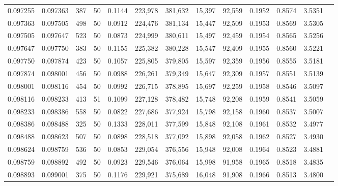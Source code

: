 \begin{tabular}{rrrrrrrrrrrrr}
0.097255 & 0.097363 &   387 &  50 &                                     0.1144 & 223,978 & 381,632 &  15,397 &  92,559 & 0.1952 & 0.8574 & 3.5351 \\
0.097363 & 0.097505 &   498 &  50 &                                     0.0912 & 224,476 & 381,134 &  15,447 &  92,509 & 0.1953 & 0.8569 & 3.5305 \\
0.097505 & 0.097647 &   523 &  50 &                                     0.0873 & 224,999 & 380,611 &  15,497 &  92,459 & 0.1954 & 0.8565 & 3.5256 \\
0.097647 & 0.097750 &   383 &  50 &                                     0.1155 & 225,382 & 380,228 &  15,547 &  92,409 & 0.1955 & 0.8560 & 3.5221 \\
0.097750 & 0.097874 &   423 &  50 &                                     0.1057 & 225,805 & 379,805 &  15,597 &  92,359 & 0.1956 & 0.8555 & 3.5181 \\
0.097874 & 0.098001 &   456 &  50 &                                     0.0988 & 226,261 & 379,349 &  15,647 &  92,309 & 0.1957 & 0.8551 & 3.5139 \\
0.098001 & 0.098116 &   454 &  50 &                                     0.0992 & 226,715 & 378,895 &  15,697 &  92,259 & 0.1958 & 0.8546 & 3.5097 \\
0.098116 & 0.098233 &   413 &  51 &                                     0.1099 & 227,128 & 378,482 &  15,748 &  92,208 & 0.1959 & 0.8541 & 3.5059 \\
0.098233 & 0.098386 &   558 &  50 &                                     0.0822 & 227,686 & 377,924 &  15,798 &  92,158 & 0.1960 & 0.8537 & 3.5007 \\
0.098386 & 0.098488 &   325 &  50 &                                     0.1333 & 228,011 & 377,599 &  15,848 &  92,108 & 0.1961 & 0.8532 & 3.4977 \\
0.098488 & 0.098623 &   507 &  50 &                                     0.0898 & 228,518 & 377,092 &  15,898 &  92,058 & 0.1962 & 0.8527 & 3.4930 \\
0.098624 & 0.098759 &   536 &  50 &                                     0.0853 & 229,054 & 376,556 &  15,948 &  92,008 & 0.1964 & 0.8523 & 3.4881 \\
0.098759 & 0.098892 &   492 &  50 &                                     0.0923 & 229,546 & 376,064 &  15,998 &  91,958 & 0.1965 & 0.8518 & 3.4835 \\
0.098893 & 0.099001 &   375 &  50 &                                     0.1176 & 229,921 & 375,689 &  16,048 &  91,908 & 0.1966 & 0.8513 & 3.4800 \\

\end{tabular}
